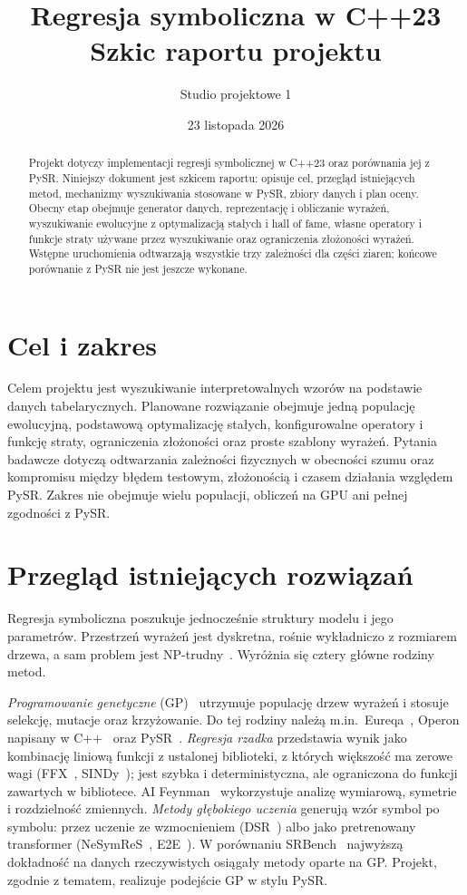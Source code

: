 \documentclass[11pt,a4paper]{article}
\title{Regresja symboliczna w C++23\\Szkic raportu projektu}
\author{Studio projektowe 1}
\date{23 listopada 2026}
\begin{document}
\maketitle

\begin{abstract}
Projekt dotyczy implementacji regresji symbolicznej w C++23 oraz porównania
jej z PySR. Niniejszy dokument jest szkicem raportu: opisuje cel, przegląd
istniejących metod, mechanizmy wyszukiwania stosowane w PySR, zbiory danych
i plan oceny. Obecny etap obejmuje generator danych, reprezentację i obliczanie
wyrażeń, wyszukiwanie ewolucyjne z optymalizacją stałych i hall of fame, własne
operatory i funkcje straty używane przez wyszukiwanie oraz ograniczenia
złożoności wyrażeń. Wstępne uruchomienia odtwarzają wszystkie trzy zależności
dla części ziaren; końcowe porównanie z PySR nie jest jeszcze wykonane.
\end{abstract}

\section{Cel i zakres}
Celem projektu jest wyszukiwanie interpretowalnych wzorów na podstawie danych
tabelarycznych. Planowane rozwiązanie obejmuje jedną populację ewolucyjną,
podstawową optymalizację stałych, konfigurowalne operatory i funkcję straty,
ograniczenia złożoności oraz proste szablony wyrażeń. Pytania badawcze dotyczą
odtwarzania zależności fizycznych w obecności szumu oraz kompromisu między
błędem testowym, złożonością i czasem działania względem PySR. Zakres nie
obejmuje wielu populacji, obliczeń na GPU ani pełnej zgodności z PySR.

\section{Przegląd istniejących rozwiązań}
Regresja symboliczna poszukuje jednocześnie struktury modelu i jego parametrów.
Przestrzeń wyrażeń jest dyskretna, rośnie wykładniczo z rozmiarem drzewa,
a sam problem jest NP-trudny~\cite{virgolin}. Wyróżnia się cztery główne
rodziny metod.

\emph{Programowanie genetyczne} (GP)~\cite{koza} utrzymuje populację drzew
wyrażeń i stosuje selekcję, mutacje oraz krzyżowanie. Do tej rodziny należą
m.in.\ Eureqa~\cite{schmidt}, Operon napisany w C++~\cite{operon} oraz
PySR~\cite{cranmer}. \emph{Regresja rzadka} przedstawia wynik jako kombinację
liniową funkcji z ustalonej biblioteki, z których większość ma zerowe wagi
(FFX~\cite{ffx}, SINDy~\cite{sindy}); jest szybka i deterministyczna, ale
ograniczona do funkcji zawartych w bibliotece. AI Feynman~\cite{aifeynman}
wykorzystuje analizę wymiarową, symetrie i rozdzielność zmiennych.
\emph{Metody głębokiego uczenia} generują wzór symbol po symbolu: przez
uczenie ze wzmocnieniem (DSR~\cite{dsr}) albo jako pretrenowany
transformer (NeSymReS~\cite{nesymres}, E2E~\cite{e2e}). W porównaniu
SRBench~\cite{srbench} najwyższą dokładność na danych rzeczywistych
osiągały metody oparte na GP. Projekt, zgodnie z tematem, realizuje
podejście GP w stylu PySR.
\end{document}
